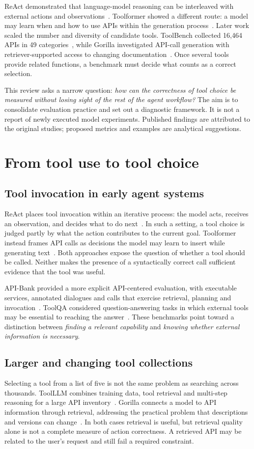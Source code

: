 \documentclass[10pt,a4paper]{article}
\begin{document}
ReAct demonstrated that language-model reasoning can be interleaved with external actions and observations~\cite{react}. Toolformer showed a different route: a model may learn when and how to use APIs within the generation process~\cite{toolformer}. Later work scaled the number and diversity of candidate tools. ToolBench collected 16,464 APIs in 49 categories~\cite{toolllm}, while Gorilla investigated API-call generation with retriever-supported access to changing documentation~\cite{gorilla}. Once several tools provide related functions, a benchmark must decide what counts as a correct selection.

This review asks a narrow question: \emph{how can the correctness of tool choice be measured without losing sight of the rest of the agent workflow?} The aim is to consolidate evaluation practice and set out a diagnostic framework. It is not a report of newly executed model experiments. Published findings are attributed to the original studies; proposed metrics and examples are analytical suggestions.

\section{From tool use to tool choice}
\subsection{Tool invocation in early agent systems}
ReAct places tool invocation within an iterative process: the model acts, receives an observation, and decides what to do next~\cite{react}. In such a setting, a tool choice is judged partly by what the action contributes to the current goal. Toolformer instead frames API calls as decisions the model may learn to insert while generating text~\cite{toolformer}. Both approaches expose the question of whether a tool should be called. Neither makes the presence of a syntactically correct call sufficient evidence that the tool was useful.

API-Bank provided a more explicit API-centered evaluation, with executable services, annotated dialogues and calls that exercise retrieval, planning and invocation~\cite{apibank}. ToolQA considered question-answering tasks in which external tools may be essential to reaching the answer~\cite{toolqa}. These benchmarks point toward a distinction between \emph{finding a relevant capability} and \emph{knowing whether external information is necessary}.

\subsection{Larger and changing tool collections}
Selecting a tool from a list of five is not the same problem as searching across thousands. ToolLLM combines training data, tool retrieval and multi-step reasoning for a large API inventory~\cite{toolllm}. Gorilla connects a model to API information through retrieval, addressing the practical problem that descriptions and versions can change~\cite{gorilla}. In both cases retrieval is useful, but retrieval quality alone is not a complete measure of action correctness. A retrieved API may be related to the user's request and still fail a required constraint.
\end{document}
